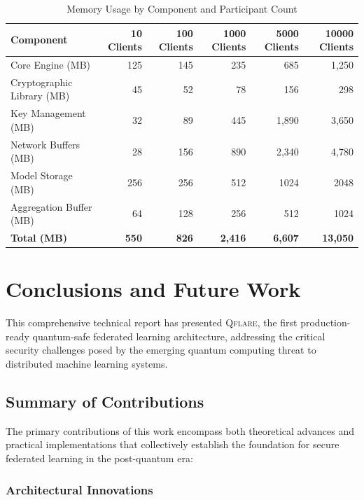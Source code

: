 \documentclass[12pt,a4paper,twoside]{book}
\newcommand{\qflare}{\textsc{Qflare}}
\begin{document}
\begin{table}[htbp]
\centering
\caption{Memory Usage by Component and Participant Count}
\label{tab:memory-usage}
\begin{tabular}{@{}lrrrrr@{}}
\toprule
\textbf{Component} & \textbf{10 Clients} & \textbf{100 Clients} & \textbf{1000 Clients} & \textbf{5000 Clients} & \textbf{10000 Clients} \\
\midrule
Core Engine (MB) & 125 & 145 & 235 & 685 & 1,250 \\
Cryptographic Library (MB) & 45 & 52 & 78 & 156 & 298 \\
Key Management (MB) & 32 & 89 & 445 & 1,890 & 3,650 \\
Network Buffers (MB) & 28 & 156 & 890 & 2,340 & 4,780 \\
Model Storage (MB) & 256 & 256 & 512 & 1024 & 2048 \\
Aggregation Buffer (MB) & 64 & 128 & 256 & 512 & 1024 \\
\midrule
\textbf{Total (MB)} & \textbf{550} & \textbf{826} & \textbf{2,416} & \textbf{6,607} & \textbf{13,050} \\
\bottomrule
\end{tabular}
\end{table}

\chapter{Conclusions and Future Work}
\label{ch:conclusion}

This comprehensive technical report has presented \qflare{}, the first production-ready quantum-safe federated learning architecture, addressing the critical security challenges posed by the emerging quantum computing threat to distributed machine learning systems.

\section{Summary of Contributions}
\label{sec:summary-contributions}

The primary contributions of this work encompass both theoretical advances and practical implementations that collectively establish the foundation for secure federated learning in the post-quantum era:

\subsection{Architectural Innovations}
\end{document}
